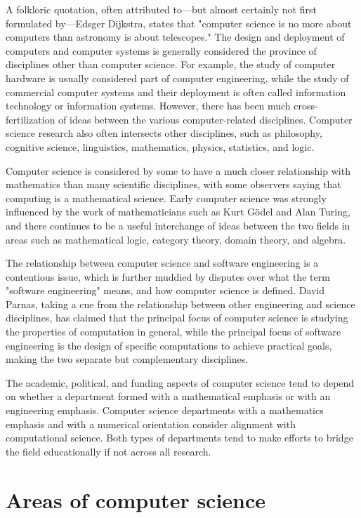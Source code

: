 A folkloric quotation, often attributed to—but almost certainly not first formulated by—Edsger Dijkstra, states that "computer science is no more about computers than astronomy is about telescopes." The design and deployment of computers and computer systems is generally considered the province of disciplines other than computer science. For example, the study of computer hardware is usually considered part of computer engineering, while the study of commercial computer systems and their deployment is often called information technology or information systems. However, there has been much cross-fertilization of ideas between the various computer-related disciplines. Computer science research also often intersects other disciplines, such as philosophy, cognitive science, linguistics, mathematics, physics, statistics, and logic.


Computer science is considered by some to have a much closer relationship with mathematics than many scientific disciplines, with some observers saying that computing is a mathematical science. Early computer science was strongly influenced by the work of mathematicians such as Kurt Gödel and Alan Turing, and there continues to be a useful interchange of ideas between the two fields in areas such as mathematical logic, category theory, domain theory, and algebra.

The relationship between computer science and software engineering is a contentious issue, which is further muddied by disputes over what the term "software engineering" means, and how computer science is defined. David Parnas, taking a cue from the relationship between other engineering and science disciplines, has claimed that the principal focus of computer science is studying the properties of computation in general, while the principal focus of software engineering is the design of specific computations to achieve practical goals, making the two separate but complementary disciplines.


The academic, political, and funding aspects of computer science tend to depend on whether a department formed with a mathematical emphasis or with an engineering emphasis. Computer science departments with a mathematics emphasis and with a numerical orientation consider alignment with computational science. Both types of departments tend to make efforts to bridge the field educationally if not across all research.





\chapter{Areas of computer science}

